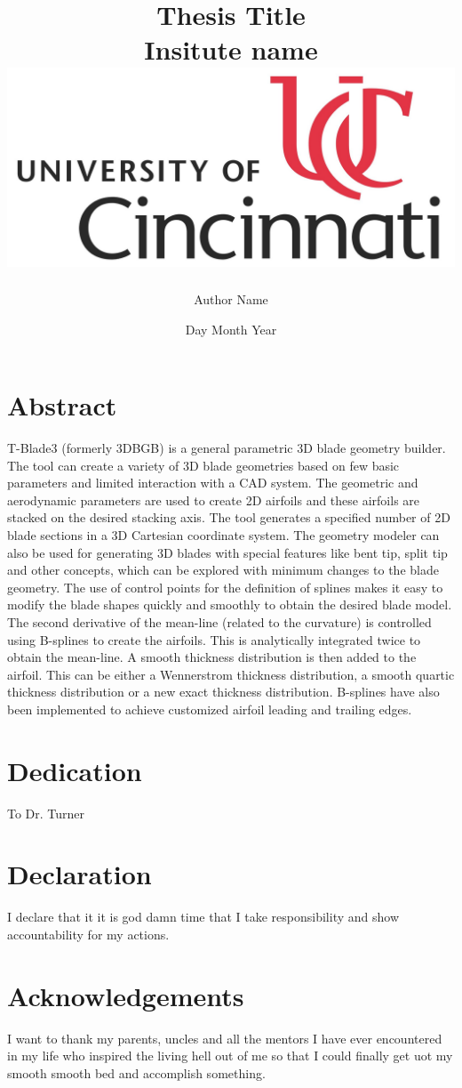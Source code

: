 \documentclass[12pt]{report}
\title{
	{Thesis Title}\\
	{\large Insitute name}\\
	{\includegraphics[scale=0.05]{university.jpg}}
}
\author{Author Name}
\date{Day Month Year}
\begin{document}
\maketitle

\chapter*{Abstract}
T-Blade3 (formerly 3DBGB) is a general parametric 3D blade geometry builder. The tool can create a variety of 3D blade geometries based on few basic parameters and limited interaction with a CAD system. The geometric and aerodynamic parameters are used to create 2D airfoils and these airfoils are stacked on the desired stacking axis. The tool generates a specified number of 2D blade sections in a 3D Cartesian coordinate system. The geometry modeler can also be used for generating 3D blades with special features like bent tip, split tip and other concepts, which can be explored with minimum changes to the blade geometry. The use of control points for the definition of splines makes it easy to modify the blade shapes quickly and smoothly to obtain the desired blade model. The second derivative of the mean-line (related to the curvature) is controlled using B-splines to create the airfoils. This is analytically integrated twice to obtain the mean-line. A smooth thickness distribution is then added to the airfoil. This can be either a Wennerstrom thickness distribution, a smooth quartic thickness distribution or a new exact thickness distribution. B-splines have also been implemented to achieve customized airfoil leading and trailing edges.

\chapter*{Dedication}
To Dr. Turner

\chapter*{Declaration}
I declare that it it is god damn time that I take responsibility and show accountability for my actions.

\chapter*{Acknowledgements}
I want to thank my parents, uncles and all the mentors I have ever encountered in my life who inspired the living hell out of me so that I could finally get uot my smooth smooth bed and accomplish something.
\end{document}
